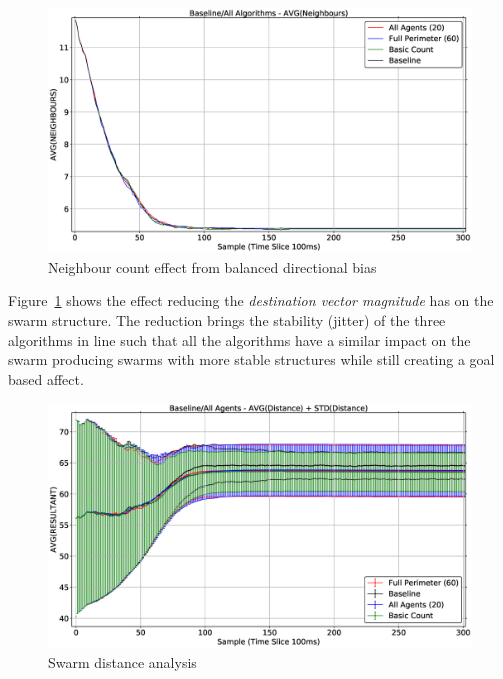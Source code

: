 \begin{figure}[H]
\begin{center}
\includegraphics[width=14cm]{CHAPTER-6/figures/SwarmNeighbourCountBalanced}
\end{center}
\caption{Neighbour count effect from balanced directional bias\label{fig:SwarmNeighbourCountBalanced}}
\end{figure}

Figure~\ref{fig:SwarmNeighbourCountBalanced} shows the effect reducing the \textit{destination vector magnitude} has on the swarm structure. The reduction brings the stability (jitter) of the three algorithms in line such that all the algorithms have a similar impact on the swarm producing swarms with more stable structures while still creating a goal based affect. 

\begin{figure}[H]
\begin{center}
\includegraphics[width=14cm]{CHAPTER-6/figures/BaselineAll100-60-20-1}
\end{center}
\caption{Swarm distance analysis\label{fig:BaselineAll100-60-20-1}}
\end{figure}

